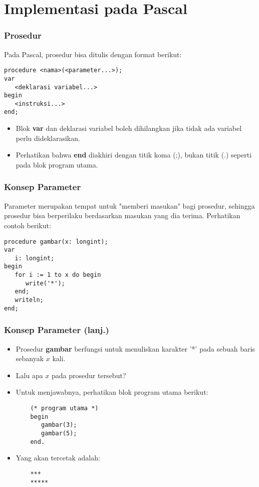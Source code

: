 \documentclass{beamer}
\begin{document}
\section{Implementasi pada Pascal}
\frame{\sectionpage}

\begin{frame}[fragile]
\frametitle{Prosedur}
Pada Pascal, prosedur bisa ditulis dengan format berikut:
\begin{lstlisting}
procedure <nama>(<parameter...>);
var
   <deklarasi variabel...>
begin
   <instruksi...>
end;
\end{lstlisting}
\begin{itemize}
    \item Blok \textbf{var} dan deklarasi variabel boleh dihilangkan jika tidak ada variabel perlu dideklarasikan.
    \item Perhatikan bahwa \textbf{end} diakhiri dengan titik koma (;), bukan titik (.) seperti pada blok program utama.
\end{itemize}
\end{frame}

\begin{frame}[fragile]
\frametitle{Konsep Parameter}
Parameter merupakan tempat untuk "memberi masukan" bagi prosedur, sehingga prosedur bisa berperilaku berdasarkan masukan yang dia terima.
\vfill
Perhatikan contoh berikut:
\begin{lstlisting}
procedure gambar(x: longint);
var
   i: longint;
begin
   for i := 1 to x do begin
      write('*');
   end;
   writeln;
end;
\end{lstlisting}
\end{frame}

\begin{frame}[fragile]
\frametitle{Konsep Parameter (lanj.)}
\begin{itemize}
    \item Prosedur \textbf{gambar} berfungsi untuk menuliskan karakter '*' pada sebuah baris sebanyak $x$ kali.
    \item Lalu apa $x$ pada prosedur tersebut?
    \item Untuk menjawabnya, perhatikan blok program utama berikut:
    \begin{lstlisting}
    (* program utama *)
    begin
       gambar(3);
       gambar(5);
    end.
    \end{lstlisting}
    \item Yang akan tercetak adalah:
    \begin{lstlisting}
    ***
    *****
    \end{lstlisting}
\end{itemize}
\end{frame}
\end{document}
